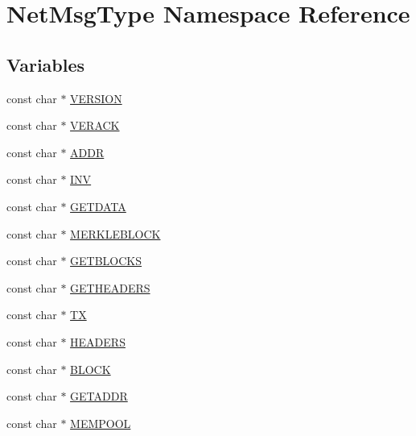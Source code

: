 \hypertarget{namespace_net_msg_type}{}\section{Net\+Msg\+Type Namespace Reference}
\label{namespace_net_msg_type}
\subsection*{Variables}
\begin{DoxyCompactItemize}
\item 
const char $\ast$ \mbox{\hyperlink{namespace_net_msg_type_a63563d95182b273387cd84a75c52832b}{V\+E\+R\+S\+I\+ON}}
\item 
const char $\ast$ \mbox{\hyperlink{namespace_net_msg_type_ae68c925ef721cf9251cf111f72b21c3f}{V\+E\+R\+A\+CK}}
\item 
const char $\ast$ \mbox{\hyperlink{namespace_net_msg_type_a6c096a13b94d05f4188e556f3d1bcfb0}{A\+D\+DR}}
\item 
const char $\ast$ \mbox{\hyperlink{namespace_net_msg_type_abc3232f64bb9898aae1b3d25f805f9a9}{I\+NV}}
\item 
const char $\ast$ \mbox{\hyperlink{namespace_net_msg_type_aab9eca9c73a0a211603dcc14e85474bf}{G\+E\+T\+D\+A\+TA}}
\item 
const char $\ast$ \mbox{\hyperlink{namespace_net_msg_type_a7c75f634586f1ffdcefd86961e41eb27}{M\+E\+R\+K\+L\+E\+B\+L\+O\+CK}}
\item 
const char $\ast$ \mbox{\hyperlink{namespace_net_msg_type_a339e2b6356faf1099abfcd0660119630}{G\+E\+T\+B\+L\+O\+C\+KS}}
\item 
const char $\ast$ \mbox{\hyperlink{namespace_net_msg_type_aca0674dd34a9d5a86b507ba60a5fa6a4}{G\+E\+T\+H\+E\+A\+D\+E\+RS}}
\item 
const char $\ast$ \mbox{\hyperlink{namespace_net_msg_type_a60f8316068456686ef69b0e07106d533}{TX}}
\item 
const char $\ast$ \mbox{\hyperlink{namespace_net_msg_type_a6bac0bfca86c6778b3fba4a3ade720fe}{H\+E\+A\+D\+E\+RS}}
\item 
const char $\ast$ \mbox{\hyperlink{namespace_net_msg_type_a1213f0378ce77802306a8a71837782b5}{B\+L\+O\+CK}}
\item 
const char $\ast$ \mbox{\hyperlink{namespace_net_msg_type_aa2bb70b7c194c1759f81d76471966386}{G\+E\+T\+A\+D\+DR}}
\item 
const char $\ast$ \mbox{\hyperlink{namespace_net_msg_type_aa518dae24cdc92edbc43011d15509ebf}{M\+E\+M\+P\+O\+OL}}

\end{DoxyCompactItemize}
